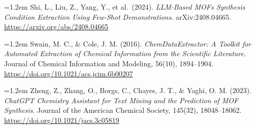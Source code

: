 \documentclass[11pt,a4paper]{article}
\newcommand{\refentry}[1]{\par\hangindent=1.2em\hangafter=1 #1\par\vspace{0.5ex}}
\begin{document}
\refentry{Shi, L., Liu, Z., Yang, Y., et al.\ (2024). \textit{LLM-Based MOFs Synthesis Condition Extraction Using Few-Shot Demonstrations}. arXiv:2408.04665. \url{https://arxiv.org/abs/2408.04665}}
\refentry{Swain, M. C., \& Cole, J. M. (2016). \textit{ChemDataExtractor: A Toolkit for Automated Extraction of Chemical Information from the Scientific Literature}. Journal of Chemical Information and Modeling, 56(10), 1894--1904. \url{https://doi.org/10.1021/acs.jcim.6b00207}}
\refentry{Zheng, Z., Zhang, O., Borgs, C., Chayes, J. T., \& Yaghi, O. M. (2023). \textit{ChatGPT Chemistry Assistant for Text Mining and the Prediction of MOF Synthesis}. Journal of the American Chemical Society, 145(32), 18048--18062. \url{https://doi.org/10.1021/jacs.3c05819}}
\end{document}
